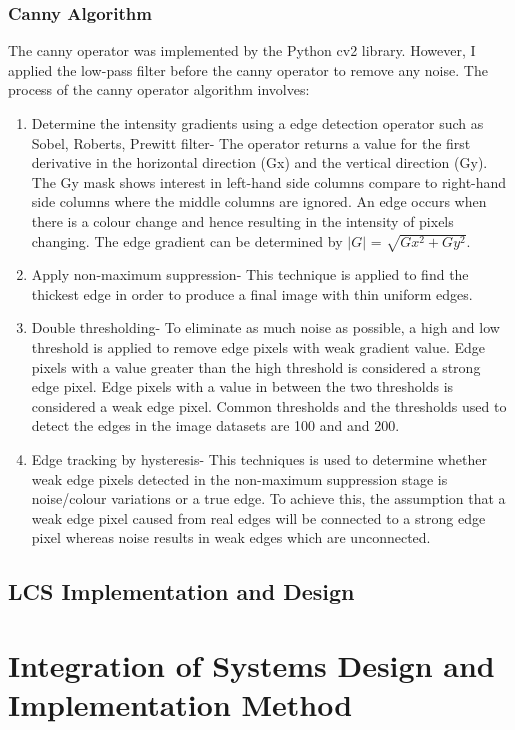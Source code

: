 \subsubsection{Canny Algorithm}

The canny operator was implemented by the Python cv2 library. However, I applied the low-pass filter before the canny operator to remove any noise. The process of the canny operator algorithm involves:
\begin{enumerate}
	\item Determine the intensity gradients using a edge detection operator such as Sobel, Roberts, Prewitt filter- The operator returns a value for the first derivative in the horizontal direction (Gx) and the vertical direction (Gy). The Gy mask shows interest in left-hand side columns compare to right-hand side columns where the middle columns are ignored. An edge occurs when there is a colour change and hence resulting in the intensity of pixels changing. The edge gradient can be determined by $|G|$ = $\sqrt{Gx^{2} + Gy^{2}} $. 
	
	\item Apply non-maximum suppression- This technique is applied to find the thickest edge in order to produce a final image with thin uniform edges.
	\item Double thresholding- To eliminate as much noise as possible, a high and low threshold is applied to remove edge pixels with weak gradient value. Edge pixels with a value greater than the high threshold is considered a strong edge pixel. Edge pixels with a value in between the two thresholds is considered a weak edge pixel. Common thresholds and the thresholds used to detect the edges in the image datasets are 100 and and 200.
	\item Edge tracking by hysteresis- This techniques is used to determine whether weak edge pixels detected in the non-maximum suppression stage is noise/colour variations or a true edge. To achieve this, the assumption that a weak edge pixel caused from real edges will be connected to a strong edge pixel whereas noise results in weak edges which are unconnected. 
	
\end{enumerate}

\subsection{LCS Implementation and Design}
\section{Integration of Systems Design and Implementation Method}

